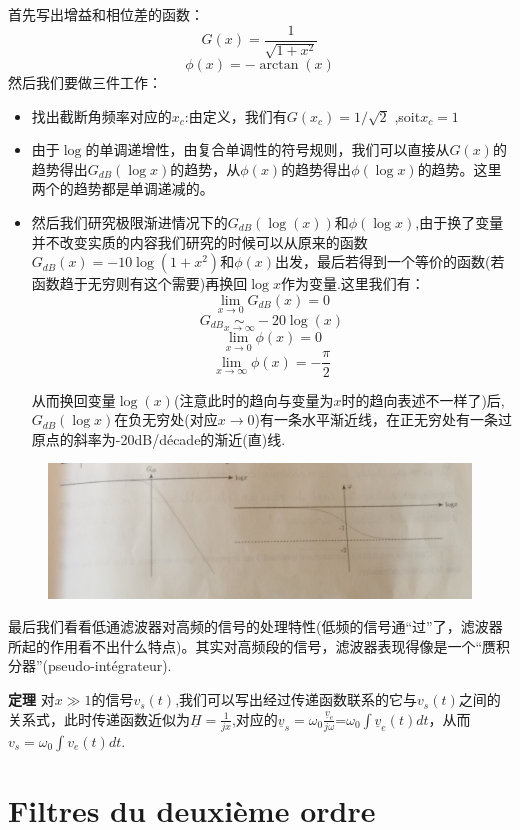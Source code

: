 \documentclass[12pt]{book}
\theoremstyle{definition}\newtheorem{dfn}{Définition}[chapter]
\theoremstyle{plain}\newtheorem{thm}{Théorème}[chapter]
\theoremstyle{plain}\newtheorem{prp}{Proposition}[chapter]
\theoremstyle{plain}\newtheorem{lem}{\bf Lemme}[chapter]
\theoremstyle{plain}\newtheorem{axm}{\bf Axiome}[chapter]
\theoremstyle{plain}\newtheorem{lmm}{\bf Lemme}[chapter]
\theoremstyle{plain}\newtheorem{cor}{\bf Corollaire}[chapter]
\theoremstyle{remark}\newtheorem{rem}{Remarque}[chapter]
\begin{document}
首先写出增益和相位差的函数：
$$
G(x)=\frac{1}{\sqrt{1+x^2}}
$$
$$
\phi(x)=-\arctan(x)
$$
然后我们要做三件工作：
\begin{itemize}
	\item 找出截断角频率对应的$x_c$:由定义，我们有$G(x_c)=1/\sqrt{2}$ ,soit$x_c=1$
	\item 
	由于$\log$的单调递增性，由复合单调性的符号规则，我们可以直接从$G(x)$的趋势得出$G_{dB}(\log x)$的趋势，从$\phi(x)$的趋势得出$\phi(\log x)$的趋势。这里两个的趋势都是单调递减的。
	\item 然后我们研究极限渐进情况下的$G_{dB}(\log(x))$和$\phi(\log x)$,由于换了变量并不改变实质的内容我们研究的时候可以从原来的函数$G_{dB}(x)=-10\log(1+x^2)$和$\phi(x)$出发，最后若得到一个等价的函数(若函数趋于无穷则有这个需要)再换回$\log x$作为变量.这里我们有：
	$$
	\lim\limits_{x\to 0}G_{dB}(x)=0
	$$
	$$
	G_{dB}\underset{x\to\infty}{\sim}-20\log(x)
	$$
	$$
	\lim\limits_{x\to0}\phi(x)=0
	$$
	$$
	\lim\limits_{x\to \infty}\phi(x)=-\frac{\pi}{2}
	$$
	
	从而换回变量$\log(x)$(注意此时的趋向与变量为$x$时的趋向表述不一样了)后,$G_{dB}(\log x)$在负无穷处(对应$x\to0$)有一条水平渐近线，在正无穷处有一条过原点的斜率为-20dB/décade的渐近(直)线.
\end{itemize}

\begin{figure}[H]
	\centering
	\includegraphics[scale=0.16]{Filtrage//4}
\end{figure}

最后我们看看低通滤波器对高频的信号的处理特性(低频的信号通“过”了，滤波器所起的作用看不出什么特点)。其实对高频段的信号，滤波器表现得像是一个“赝积分器”(pseudo-intégrateur).
\begin{framed}{\textbf{定理}}
	对$x\gg1$的信号$v_s(t)$,我们可以写出经过传递函数联系的它与$v_s(t)$之间的关系式，此时传递函数近似为$\underline{H}=\frac{1}{jx}$,对应的$\underline{v}_s=\omega_0\frac{\underline{v}_e}{j\omega}$=$\omega_0$$\int\underline{v}_e(t)dt$，从而$v_s=\omega_0\int v_e(t)dt$.
\end{framed}

\section{Filtres du deuxième ordre}
\end{document}
